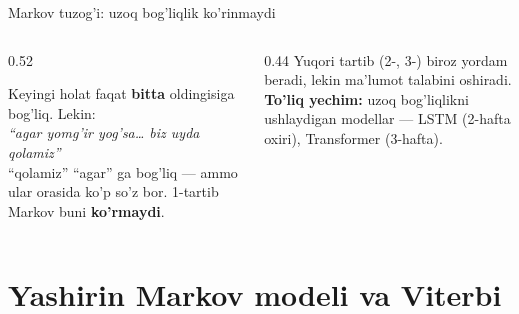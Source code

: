 \documentclass[aspectratio=169,11pt]{beamer}
\begin{document}
\begin{frame}{Markov tuzog'i: uzoq bog'liqlik ko'rinmaydi}
  \begin{columns}[T]
    \begin{column}{0.52\textwidth}
      \begin{tcolorbox}[warnbox,title=1-tartib cheklovi]
        \small
        Keyingi holat faqat \textbf{bitta} oldingisiga bog'liq. Lekin:\\[3pt]
        \textit{``agar yomg'ir yog'sa\ldots{} biz uyda qolamiz''}\\[3pt]
        ``qolamiz'' ``agar'' ga bog'liq --- ammo ular orasida ko'p so'z bor.
        1-tartib Markov buni \textbf{ko'rmaydi}.
      \end{tcolorbox}
    \end{column}
    \begin{column}{0.44\textwidth}
      \footnotesize
      Yuqori tartib (2-, 3-) biroz yordam beradi, lekin ma'lumot talabini
      oshiradi.\\[4pt]
      \textbf{To'liq yechim:} uzoq bog'liqlikni ushlaydigan modellar ---
      LSTM (2-hafta oxiri), Transformer (3-hafta).
    \end{column}
  \end{columns}
\end{frame}

\section[HMM]{Yashirin Markov modeli va Viterbi}
\end{document}
